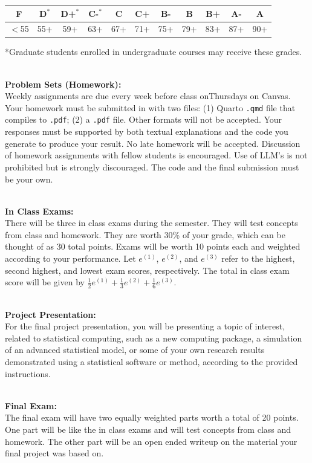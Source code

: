 \documentclass{article}
\begin{document}
\begin{center}
\begin{tabular}{ccccccccccc}
F & D$^*$ & D+$^*$ & C-$^*$ & C & C+ & B- & B & B+ & A- & A\\
\hline
$<$55 & 55+ &  59+ & 63+ & 67+ & 71+ & 75+ & 79+ & 83+ & 87+ & 90+ 
\end{tabular}
\end{center}
*Graduate students enrolled in undergraduate courses may receive these grades.


\vspace{2mm} \\
\noindent \textbf{Problem Sets (Homework):} \\ 
Weekly assignments are due every week before class onThursdays on Canvas. Your homework must be submitted in with two files: (1) Quarto \texttt{.qmd}  file that compiles to \texttt{.pdf}; (2) a  \texttt{.pdf} file. Other formats will not be accepted. Your responses must be supported by both textual explanations and the code you generate to produce your result. No late homework will be accepted. Discussion of homework assignments with fellow students is encouraged. Use of LLM's is not prohibited but is strongly discouraged. The code and the final submission must be your own. 

\vspace{2mm} \\
\noindent \textbf{In Class Exams:} \\ 
There will be three in class exams during the semester. They will test concepts from class and homework. They are worth 30\% of your grade, which can be thought of as 30 total points. Exams will be worth 10 points each and weighted according to your performance. Let $e^{(1)}$, $e^{(2)}$, and $e^{(3)}$ refer to the highest, second highest, and lowest exam scores, respectively. The total in class exam score will be given by $\frac{1}{2} e^{(1)} + \frac{1}{3} e^{(2)} + \frac{1}{6} e^{(3)}$.

\vspace{2mm} \\
\noindent \textbf{Project Presentation:} \\ 
For the final project presentation, you will be presenting a topic of interest, related to statistical computing, such as a new computing package, a simulation of an advanced statistical model, or some of your own research results demonstrated using a statistical software or method, according to the provided instructions.  

\vspace{2mm} \\
\noindent \textbf{Final Exam:} \\ 
The final exam will have two equally weighted parts worth a total of 20 points. One part will be like the in class exams and will test concepts from class and homework. The other part will be an open ended writeup on the material your final project was based on.
\end{document}
